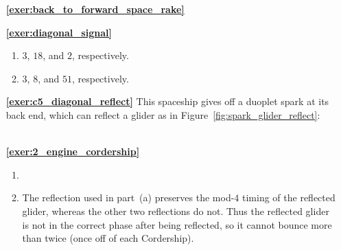 \begin{multicols}{2}
\begin{itemize}[leftmargin=0em]
		
	\item[\bf\color{ocre}\sffamily\ref{exer:back_to_forward_space_rake}]  \\
	
	
	\item[\bf\color{ocre}\sffamily\ref{exer:diagonal_signal}]
	\begin{enumerate}[leftmargin=1.5em,label=\bf\color{ocre}(\alph*)]
		\item $3$, $18$, and $2$, respectively. \\
		
		\item $3$, $8$, and $51$, respectively. \\
	\end{enumerate}
	
	
	\item[\bf\color{ocre}\sffamily\ref{exer:c5_diagonal_reflect}] This spaceship gives off a duoplet spark at its back end, which can reflect a glider as in Figure~\ref{fig:spark_glider_reflect}: \\[-0.6em]
	
	 \\
	
	
	\item[\bf\color{ocre}\sffamily\ref{exer:2_engine_cordership}]
	\begin{enumerate}[leftmargin=1.5em,label=\bf\color{ocre}(\alph*)]
		\item {} \\
		
		\item The reflection used in part~(a) preserves the mod-$4$ timing of the reflected glider, whereas the other two reflections do not. Thus the reflected glider is not in the correct phase after being reflected, so it cannot bounce more than twice (once off of each Cordership). \\
	\end{enumerate}
	\end{itemize}
\end{multicols}


\hypertarget{solutions_glider_synthesis}{}\label{solutions_glider_synthesis}
